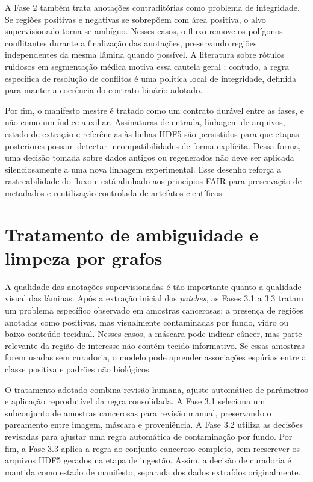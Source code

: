 A Fase 2 também trata anotações contraditórias como problema de integridade. Se
regiões positivas e negativas se sobrepõem com área positiva, o alvo
supervisionado torna-se ambíguo. Nesses casos, o fluxo remove os polígonos
conflitantes durante a finalização das anotações, preservando regiões
independentes da mesma lâmina quando possível. A literatura sobre rótulos
ruidosos em segmentação médica motiva essa cautela geral \cite{yu2020noisy};
contudo, a regra específica de resolução de conflitos é uma política local de
integridade, definida para manter a coerência do contrato binário adotado.

Por fim, o manifesto mestre é tratado como um contrato durável entre as fases,
e não como um índice auxiliar. Assinaturas de entrada, linhagem de arquivos,
estado de extração e referências às linhas HDF5 são persistidos para que etapas
posteriores possam detectar incompatibilidades de forma explícita. Dessa forma,
uma decisão tomada sobre dados antigos ou regenerados não deve ser aplicada
silenciosamente a uma nova linhagem experimental. Esse desenho reforça a
rastreabilidade do fluxo e está alinhado aos princípios FAIR para preservação de
metadados e reutilização controlada de artefatos científicos
\cite{wilkinson2016fair}.

\section{Tratamento de ambiguidade e limpeza por grafos}
\label{sec:met_limpeza_grafos}

A qualidade das anotações supervisionadas é tão importante quanto a qualidade
visual das lâminas. Após a extração inicial dos \textit{patches}, as
Fases 3.1 a 3.3 tratam um problema específico observado em amostras cancerosas:
a presença de regiões anotadas como positivas, mas visualmente contaminadas por
fundo, vidro ou baixo conteúdo tecidual. Nesses casos, a máscara pode indicar
câncer, mas parte relevante da região de interesse não contém tecido
informativo. Se essas amostras forem usadas sem curadoria, o modelo pode
aprender associações espúrias entre a classe positiva e padrões não biológicos.

O tratamento adotado combina revisão humana, ajuste automático de parâmetros e
aplicação reprodutível da regra consolidada. A Fase 3.1 seleciona um subconjunto
de amostras cancerosas para revisão manual, preservando o pareamento entre
imagem, máscara e proveniência. A Fase 3.2 utiliza as decisões revisadas para
ajustar uma regra automática de contaminação por fundo. Por fim, a Fase 3.3
aplica a regra ao conjunto canceroso completo, sem reescrever os arquivos HDF5
gerados na etapa de ingestão. Assim, a decisão de curadoria é mantida como
estado de manifesto, separada dos dados extraídos originalmente.

